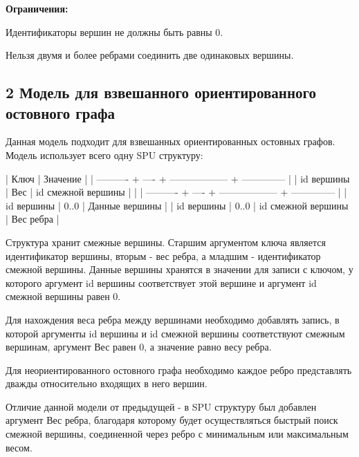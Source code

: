 {\bfseries Ограничения\+:}
\begin{DoxyEnumerate}
\item Идентификаторы вершин не должны быть равны 0.
\item Нельзя двумя и более ребрами соединить две одинаковых вершины.
\end{DoxyEnumerate}\hypertarget{md_docs__xD0_x93_xD1_x80_xD0_xB0_xD1_x84_xD0_xBE_xD0_xB2_xD1_x8B_xD0_xB5__xD0_xBC_xD0_xBE_xD0_xB4_xD0_xB5_xD0_xBB_xD0_xB8_autotoc_md5}{}\subsection{2 Модель для взвешанного ориентированного остовного графа}\label{md_docs__xD0_x93_xD1_x80_xD0_xB0_xD1_x84_xD0_xBE_xD0_xB2_xD1_x8B_xD0_xB5__xD0_xBC_xD0_xBE_xD0_xB4_xD0_xB5_xD0_xBB_xD0_xB8_autotoc_md5}
Данная модель подходит для взвешанных ориентированных остовных графов. Модель использует всего одну S\+PU структуру\+:


\begin{DoxyCode}
| Ключ                                   | Значение       |
| ---------- + ---- + ------------------ + -------------- |
| id вершины | Вес  | id смежной вершины |                |
| ---------- + ---- + ------------------ + -------------- |
| id вершины | 0..0                      | Данные вершины |
| id вершины | 0..0 | id смежной вершины | Вес ребра      | 
\end{DoxyCode}


Структура хранит смежные вершины. Старшим аргументом ключа является идентификатор вершины, вторым -\/ вес ребра, а младшим -\/ идентификатор смежной вершины. Данные вершины хранятся в значении для записи с ключом, у которого аргумент {\ttfamily id вершины} соответствует этой вершине и аргумент {\ttfamily id смежной вершины} равен 0.

Для нахождения веса ребра между вершинами необходимо добавлять запись, в которой аргументы {\ttfamily id вершины} и {\ttfamily id смежной вершины} соответствуют смежным вершинам, аргумент {\ttfamily Вес} равен 0, а значение равно весу ребра.

Для неориентированного остовного графа необходимо каждое ребро представлять дважды относительно входящих в него вершин.

Отличие данной модели от предыдущей -\/ в S\+PU структуру был добавлен аргумент {\ttfamily Вес ребра}, благодаря которому будет осуществляться быстрый поиск смежной вершины, соединенной через ребро с минимальным или максимальным весом.

